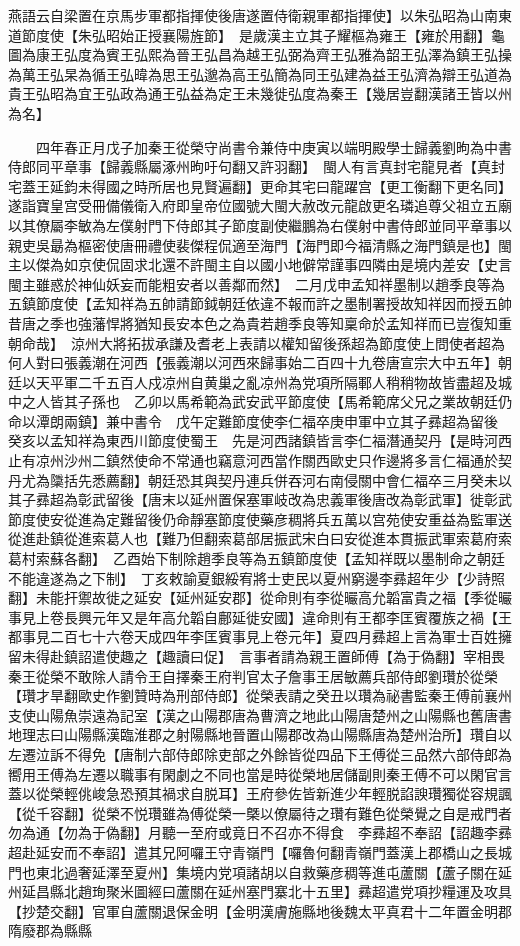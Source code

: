 燕語云自梁置在京馬步軍都指揮使後唐遂置侍衛親軍都指揮使】以朱弘昭為山南東道節度使【朱弘昭始正授襄陽旌節】　是歲漢主立其子耀樞為雍王【雍於用翻】龜圖為康王弘度為賓王弘熙為晉王弘昌為越王弘弼為齊王弘雅為韶王弘澤為鎮王弘操為萬王弘杲為循王弘暐為思王弘邈為高王弘簡為同王弘建為益王弘濟為辯王弘道為貴王弘昭為宜王弘政為通王弘益為定王未幾徙弘度為秦王【幾居豈翻漢諸王皆以州為名】

　　四年春正月戊子加秦王從榮守尚書令兼侍中庚寅以端明殿學士歸義劉昫為中書侍郎同平章事【歸義縣屬涿州昫吁句翻又許羽翻】　閩人有言真封宅龍見者【真封宅蓋王延鈞未得國之時所居也見賢遍翻】更命其宅曰龍躍宫【更工衡翻下更名同】遂詣寶皇宫受冊備儀衛入府即皇帝位國號大閩大赦改元龍啟更名璘追尊父祖立五廟以其僚屬李敏為左僕射門下侍郎其子節度副使繼鵬為右僕射中書侍郎並同平章事以親吏吳朂為樞密使唐冊禮使裴傑程侃適至海門【海門即今福清縣之海門鎮是也】閩主以傑為如京使侃固求北還不許閩主自以國小地僻常謹事四隣由是境内差安【史言閩主雖惑於神仙妖妄而能粗安者以善鄰而然】　二月戊申孟知祥墨制以趙季良等為五鎮節度使【孟知祥為五帥請節鉞朝廷依違不報而許之墨制署授故知祥因而授五帥昔唐之季也強藩悍將猶知長安本色之為貴若趙季良等知稟命於孟知祥而已豈復知重朝命哉】　涼州大將拓拔承謙及耆老上表請以權知留後孫超為節度使上問使者超為何人對曰張義潮在河西【張義潮以河西來歸事始二百四十九卷唐宣宗大中五年】朝廷以天平軍二千五百人戍凉州自黄巢之亂凉州為党項所隔鄆人稍稍物故皆盡超及城中之人皆其子孫也　乙卯以馬希範為武安武平節度使【馬希範席父兄之業故朝廷仍命以潭朗兩鎮】兼中書令　戊午定難節度使李仁福卒庚申軍中立其子彞超為留後　癸亥以孟知祥為東西川節度使蜀王　先是河西諸鎮皆言李仁福潛通契丹【是時河西止有凉州沙州二鎮然使命不常通也竊意河西當作關西歐史只作邊將多言仁福通於契丹尤為櫽括先悉薦翻】朝廷恐其與契丹連兵併吞河右南侵關中會仁福卒三月癸未以其子彞超為彰武留後【唐末以延州置保塞軍岐改為忠義軍後唐改為彰武軍】徙彰武節度使安從進為定難留後仍命靜塞節度使藥彦稠將兵五萬以宫苑使安重益為監軍送從進赴鎮從進索葛人也【難乃但翻索葛部居振武宋白曰安從進本貫振武軍索葛府索葛村索蘇各翻】　乙酉始下制除趙季良等為五鎮節度使【孟知祥既以墨制命之朝廷不能違遂為之下制】　丁亥敕諭夏銀綏宥將士吏民以夏州窮邊李彞超年少【少詩照翻】未能扞禦故徙之延安【延州延安郡】從命則有李從曮高允韜富貴之福【季從曮事見上卷長興元年又是年高允韜自鄜延徙安國】違命則有王都李匡賓覆族之禍【王都事見二百七十六卷天成四年李匡賓事見上卷元年】夏四月彞超上言為軍士百姓擁留未得赴鎮詔遣使趣之【趣讀曰促】　言事者請為親王置師傅【為于偽翻】宰相畏秦王從榮不敢除人請令王自擇秦王府判官太子詹事王居敏薦兵部侍郎劉瓚於從榮【瓚才旱翻歐史作劉贊時為刑部侍郎】從榮表請之癸丑以瓚為祕書監秦王傅前襄州支使山陽魚崇遠為記室【漢之山陽郡唐為曹濟之地此山陽唐楚州之山陽縣也舊唐書地理志曰山陽縣漢臨淮郡之射陽縣地晉置山陽郡改為山陽縣唐為楚州治所】瓚自以左遷泣訴不得免【唐制六部侍郎除吏部之外餘皆從四品下王傅從三品然六部侍郎為嚮用王傅為左遷以職事有閑劇之不同也當是時從榮地居儲副則秦王傅不可以閑官言蓋以從榮輕佻峻急恐預其禍求自脱耳】王府參佐皆新進少年輕脱諂諛瓚獨從容規諷【從千容翻】從榮不悦瓚雖為傅從榮一槩以僚屬待之瓚有難色從榮覺之自是戒門者勿為通【勿為于偽翻】月聽一至府或竟日不召亦不得食　李彞超不奉詔【詔趣李彞超赴延安而不奉詔】遣其兄阿囉王守青嶺門【囉魯何翻青嶺門蓋漢上郡橋山之長城門也東北過奢延澤至夏州】集境内党項諸胡以自救藥彦稠等進屯蘆關【蘆子關在延州延昌縣北趙珣聚米圖經曰蘆關在延州塞門寨北十五里】彞超遣党項抄糧運及攻具【抄楚交翻】官軍自蘆關退保金明【金明漢膚施縣地後魏太平真君十二年置金明郡隋廢郡為縣縣